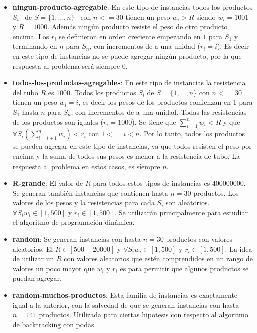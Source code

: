 \documentclass[10pt,a4paper]{article}
\begin{document}
\begin{itemize}
    \item \textbf{ningun-producto-agregable}: En este tipo de instancias todos los productos $S_i$ ~de $S = \{1, \hdots, n\}$~ con $n <= 30$ tienen un peso $w_i > R$ siendo $w_i = 1001$ y $R = 1000$. Además ningún producto resiste el peso de otro producto encima. Los $r_i$ se definieron en orden creciente empezando en $1$ para $S_1$ y terminando en $n$ para $S_n$, con incrementos de a una unidad ($r_i = i$). Es decir en este tipo de instancias no se puede agregar ningún producto, por la que respuesta al problema será siempre 0.
    \item \textbf{todos-los-productos-agregables}: En este tipo de instancias la resistencia del tubo $R$ es 1000. Todos los productos $S_i$ de $S = \{1, \hdots, n\}$ con $n <= 30$ tienen un peso $w_i = i$, es decir los pesos de los productos comienzan en 1 para $S_1$ hasta $n$ para $S_n$, con incrementos de a una unidad. Todas las resistencias de los productos son iguales ($r_i = 1000$). Se tiene que $\sum_{i=1}^{n}w_i<R$ y que $\forall S_i (\sum_{i=i+1}^{n}w_i)< r_i$ con $1<=i<n$.  Por lo tanto, todos los productos se pueden agregar en este tipo de instancias, ya que todos resisten el peso por encima y la suma de todos sus pesos es menor a la resistencia de tubo. La respuesta al problema en estos casos, es siempre $n$.
    \item \textbf{R-grande}: El valor de $R$ para todos estos tipos de instancias es 400000000. Se generan también instancias que contienen hasta $n=30$ productos. Los valores de los pesos y la resistencias para cada $S_i$ son aleatorios. $\forall S_i w_i \in [1,500]$ y $r_i \in [1,500] $. Se utilizarán principalmente para estudiar el algoritmo de programación dinámica.
    \item \textbf{random}: Se generan instancias con hasta $n = 30$ productos con valores aleatorios. El $R \in [500-20000]$ y $\forall S_i w_i \in [1,500]$ y $r_i \in [1,500] $. La idea de utilizar un $R$ con valores aleatorios que estén comprendidos en un rango de valores un poco mayor que $w_i$ y $r_i$ es para permitir que algunos productos se puedan agregar.
    \item \textbf{random-muchos-productos}: Esta familia de instancias es exactamente igual a la anterior, con la salvedad de que se generan instancias con hasta $n = 141$ productos. Utilizada para ciertas hipotesis con respecto al algoritmo de backtracking con podas.
\end{itemize}
\end{document}
